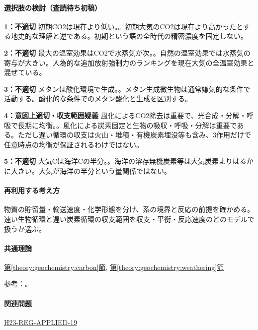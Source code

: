 \paragraph{選択肢の検討（査読待ち初稿）}\mbox{}\par

\noindent\textbf{1：不適切} 初期CO2は現在より低い。。初期大気のCO2は現在より高かったとする地史的な理解と逆である。初期という語の全時代の精密濃度を固定しない。\par

\noindent\textbf{2：不適切} 最大の温室効果はCO2で水蒸気が次。。自然の温室効果では水蒸気の寄与が大きい。人為的な追加放射強制力のランキングを現在大気の全温室効果と混ぜている。\par

\noindent\textbf{3：不適切} メタンは酸化環境で生成。。メタン生成微生物は通常嫌気的な条件で活動する。酸化的な条件でのメタン酸化と生成を区別する。\par

\noindent\textbf{4：意図上適切・収支範囲疑義} 風化によるCO2除去は重要で、光合成・分解・呼吸で長期に均衡。。風化による炭素固定と生物の吸収・呼吸・分解は重要である。ただし遅い循環の収支は火山・堆積・有機炭素埋没等も含み、3作用だけで任意時点の均衡が保証されるわけではない。\par

\noindent\textbf{5：不適切} 大気Cは海洋Cの半分。。海洋の溶存無機炭素等は大気炭素よりはるかに大きい。大気が海洋の半分という量関係ではない。\par

\paragraph{再利用する考え方} 物質の貯留量・輸送速度・化学形態を分け、系の境界と反応の前提を確かめる。速い生物循環と遅い炭素循環の収支範囲を収支・平衡・反応速度のどのモデルで扱うか選ぶ。

\paragraph{共通理論} \hyperref[theory:geochemistry:carbon]{第\ref*{theory:geochemistry:carbon}節}, \hyperref[theory:geochemistry:weathering]{第\ref*{theory:geochemistry:weathering}節}

\par 参考：\cite{gc_carbon,atm_noaa_ghg}。

\paragraph{関連問題} \hyperref[q:h23-reg-applied-19]{H23-REG-APPLIED-19}

